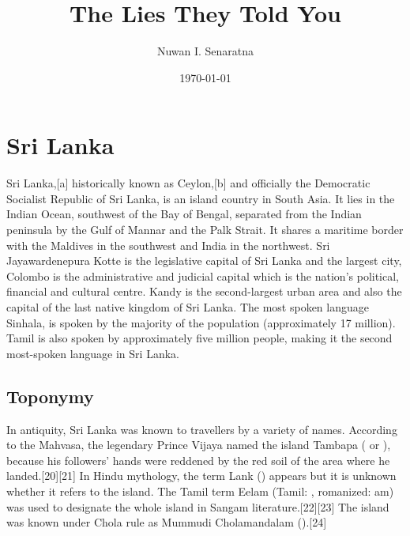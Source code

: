 \documentclass[12pt,openany]{book}
\let\oldsay\say
\renewcommand{\say}[1]{\oldsay{\textcolor{maroon}{#1}}}
\begin{document}
\frontmatter
\title{The Lies They Told You}
\author{Nuwan I. Senaratna}
\date{\today}

\maketitle

\tableofcontents
\clearpage  

\mainmatter{}
\setcounter{chapter}{1}
\chapter*{Sri Lanka}

Sri Lanka,[a] historically known as Ceylon,[b] and officially the Democratic Socialist Republic of Sri Lanka, is an island country in South Asia. It lies in the Indian Ocean, southwest of the Bay of Bengal, separated from the Indian peninsula by the Gulf of Mannar and the Palk Strait. It shares a maritime border with the Maldives in the southwest and India in the northwest. Sri Jayawardenepura Kotte is the legislative capital of Sri Lanka and the largest city, Colombo is the administrative and judicial capital which is the nation's political, financial and cultural centre. Kandy is the second-largest urban area and also the capital of the last native kingdom of Sri Lanka. The most spoken language Sinhala, is spoken by the majority of the population (approximately 17 million). Tamil is also spoken by approximately five million people, making it the second most-spoken language in Sri Lanka.

\section*{Toponymy}

In antiquity, Sri Lanka was known to travellers by a variety of names. According to the Mahvasa, the legendary Prince Vijaya named the island Tambapa (\say{copper-red hands} or \say{copper-red earth}), because his followers' hands were reddened by the red soil of the area where he landed.[20][21] In Hindu mythology, the term Lank (\say{Island}) appears but it is unknown whether it refers to the island. The Tamil term Eelam (Tamil: , romanized: am) was used to designate the whole island in Sangam literature.[22][23] The island was known under Chola rule as Mummudi Cholamandalam (\say{realm of the three crowned Cholas}).[24]
\end{document}
